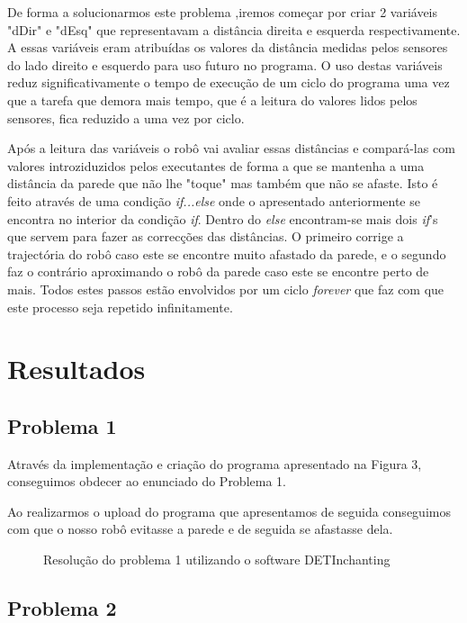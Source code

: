 \documentclass[a4paper, 12pt, onecolumn, oneside]{report}
\begin{document}
De forma a solucionarmos este problema ,iremos  começar por criar 2 variáveis "dDir" e "dEsq" que representavam a distância direita e esquerda respectivamente. A essas variáveis eram atribuídas os valores da distância medidas pelos sensores do lado direito e esquerdo para uso futuro no programa. O uso destas variáveis reduz significativamente o tempo de execução de um ciclo do programa uma vez que a tarefa que demora mais tempo, que é a leitura do valores lidos pelos sensores, fica reduzido a uma vez por ciclo.

Após a leitura das variáveis o robô vai avaliar essas distâncias e compará-las com valores introziduzidos pelos executantes de forma a que se mantenha a uma distância da parede que não lhe "toque" mas também que não se afaste. Isto é feito através de uma condição \emph{if...else} onde o apresentado anteriormente se encontra no interior da condição \emph{if}. Dentro do \emph{else} encontram-se mais dois \emph{if}'s que servem para fazer as correcções das distâncias. O primeiro corrige a trajectória do robô caso este se encontre muito afastado da parede, e o segundo faz o contrário aproximando o robô da parede caso este se encontre perto de mais. Todos estes passos estão envolvidos por um ciclo \emph{forever} que faz com que este processo seja repetido infinitamente.

 \newpage
\section{Resultados}

\subsection{Problema 1}

Através da implementação e criação do programa apresentado na Figura 3, conseguimos obdecer ao enunciado do Problema 1.

Ao realizarmos o upload do programa que apresentamos de seguida conseguimos com que o nosso robô evitasse a parede e de seguida se afastasse dela. 

\begin{figure}[H]
\caption{Resolução do problema 1 utilizando o software DETInchanting}
\label{fig:speciation}
\end{figure}


\subsection{Problema 2}
\end{document}
